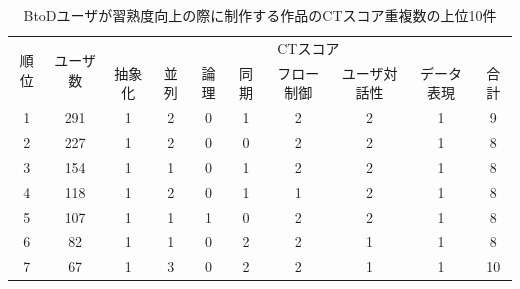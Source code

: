 \documentclass[submit,ses,noauthor]{ipsj}
\begin{document}
\begin{table}[]
\caption{BtoDユーザが習熟度向上の際に制作する作品のCTスコア重複数の上位10件}
  \label{tab:ranking-btod}
  \vspace{2mm}
  \centering
\begin{tabular}{c|c|cccccccc}
\hline
\multirow{2}{*}{順位} & \multirow{2}{*}{ユーザ数} & \multicolumn{8}{c}{CTスコア}                                                                                               \\ \cline{3-10} 
                    &                      & \multicolumn{1}{c|}{抽象化}  & \multicolumn{1}{c|}{並列} & \multicolumn{1}{c|}{論理} & \multicolumn{1}{c|}{同期} & \multicolumn{1}{c|}{フロー制御} & \multicolumn{1}{c|}{ユーザ対話性} & \multicolumn{1}{c|}{データ表現} & 合計 \\ \hline
                    \hline
1                   & 291                  & \multicolumn{1}{c|}{1} & \multicolumn{1}{c|}{2} & \multicolumn{1}{c|}{0} & \multicolumn{1}{c|}{1} & \multicolumn{1}{c|}{2} & \multicolumn{1}{c|}{2} & \multicolumn{1}{c|}{1} & 9  \\ \hline
2                   & 227                  & \multicolumn{1}{c|}{1} & \multicolumn{1}{c|}{2} & \multicolumn{1}{c|}{0} & \multicolumn{1}{c|}{0} & \multicolumn{1}{c|}{2} & \multicolumn{1}{c|}{2} & \multicolumn{1}{c|}{1} & 8  \\ \hline
3                   & 154                  & \multicolumn{1}{c|}{1} & \multicolumn{1}{c|}{1} & \multicolumn{1}{c|}{0} & \multicolumn{1}{c|}{1} & \multicolumn{1}{c|}{2} & \multicolumn{1}{c|}{2} & \multicolumn{1}{c|}{1} & 8  \\ \hline
4                   & 118                  & \multicolumn{1}{c|}{1} & \multicolumn{1}{c|}{2} & \multicolumn{1}{c|}{0} & \multicolumn{1}{c|}{1} & \multicolumn{1}{c|}{1} & \multicolumn{1}{c|}{2} & \multicolumn{1}{c|}{1} & 8  \\ \hline
5                   & 107                  & \multicolumn{1}{c|}{1} & \multicolumn{1}{c|}{1} & \multicolumn{1}{c|}{1} & \multicolumn{1}{c|}{0} & \multicolumn{1}{c|}{2} & \multicolumn{1}{c|}{2} & \multicolumn{1}{c|}{1} & 8  \\ \hline
6                   & 82                   & \multicolumn{1}{c|}{1} & \multicolumn{1}{c|}{1} & \multicolumn{1}{c|}{0} & \multicolumn{1}{c|}{2} & \multicolumn{1}{c|}{2} & \multicolumn{1}{c|}{1} & \multicolumn{1}{c|}{1} & 8  \\ \hline
7                   & 67                   & \multicolumn{1}{c|}{1} & \multicolumn{1}{c|}{3} & \multicolumn{1}{c|}{0} & \multicolumn{1}{c|}{2} & \multicolumn{1}{c|}{2} & \multicolumn{1}{c|}{1} & \multicolumn{1}{c|}{1} & 10 \\ \hline

\end{tabular}
\end{table}
\end{document}
